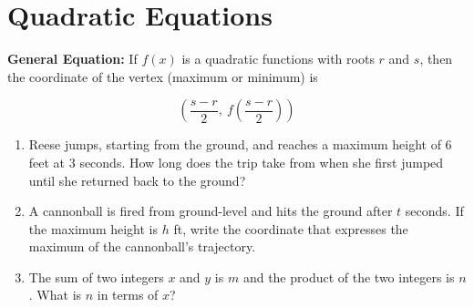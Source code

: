 \section{Quadratic Equations}

\bigskip
\textbf{General Equation:} If $f(x)$ is a quadratic functions with roots $r$ and $s$, then the coordinate of the vertex (maximum or minimum) is

\[\left(\frac{s-r}{2},\ f\left(\frac{s-r}{2}\right)\right)\]

\vfill
\begin{enumerate}[labelindent=*,style=multiline,leftmargin=*,label=\textbf{Example \arabic*:}]
\item Reese jumps, starting from the ground, and reaches a maximum height of 6 feet at 3 seconds. How long does the trip take from when she first jumped until she returned back to the ground?

\vfill\item A cannonball is fired from ground-level and hits the ground after $t$ seconds. If the maximum height is $h$ ft, write the coordinate that expresses the maximum of the cannonball's trajectory.

\vfill\item The sum of two integers $x$ and $y$ is $m$ and the product of the two integers is $n$. What is $n$ in terms of $x$?
\end{enumerate}

